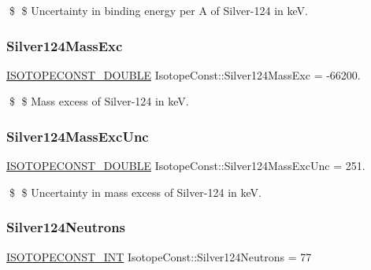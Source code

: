 \$ \$ Uncertainty in binding energy per A of Silver-\/124 in keV. \mbox{\label{group___isotope_const-_silver-_ag124_ga24d971a15c5fca92cd052569fea8df6f}} 
\subsubsection{\texorpdfstring{Silver124\+Mass\+Exc}{Silver124MassExc}}
{\footnotesize\ttfamily \mbox{\hyperlink{group___isotope_const-_macros_ga8f45a7272ce02c0b4c65c44636ed719a}{I\+S\+O\+T\+O\+P\+E\+C\+O\+N\+S\+T\+\_\+\+D\+O\+U\+B\+LE}} Isotope\+Const\+::\+Silver124\+Mass\+Exc = -\/66200.}

\$ \$ Mass excess of Silver-\/124 in keV. \mbox{\label{group___isotope_const-_silver-_ag124_gab128dbf3ce246dc351a28de60f807e80}} 
\subsubsection{\texorpdfstring{Silver124\+Mass\+Exc\+Unc}{Silver124MassExcUnc}}
{\footnotesize\ttfamily \mbox{\hyperlink{group___isotope_const-_macros_ga8f45a7272ce02c0b4c65c44636ed719a}{I\+S\+O\+T\+O\+P\+E\+C\+O\+N\+S\+T\+\_\+\+D\+O\+U\+B\+LE}} Isotope\+Const\+::\+Silver124\+Mass\+Exc\+Unc = 251.}

\$ \$ Uncertainty in mass excess of Silver-\/124 in keV. \mbox{\label{group___isotope_const-_silver-_ag124_gad628d1f869a400cdebd04bb13a5e9975}} 
\subsubsection{\texorpdfstring{Silver124\+Neutrons}{Silver124Neutrons}}
{\footnotesize\ttfamily \mbox{\hyperlink{group___isotope_const-_macros_ga5f18360b3e99483a35c32d789e62621c}{I\+S\+O\+T\+O\+P\+E\+C\+O\+N\+S\+T\+\_\+\+I\+NT}} Isotope\+Const\+::\+Silver124\+Neutrons = 77}


